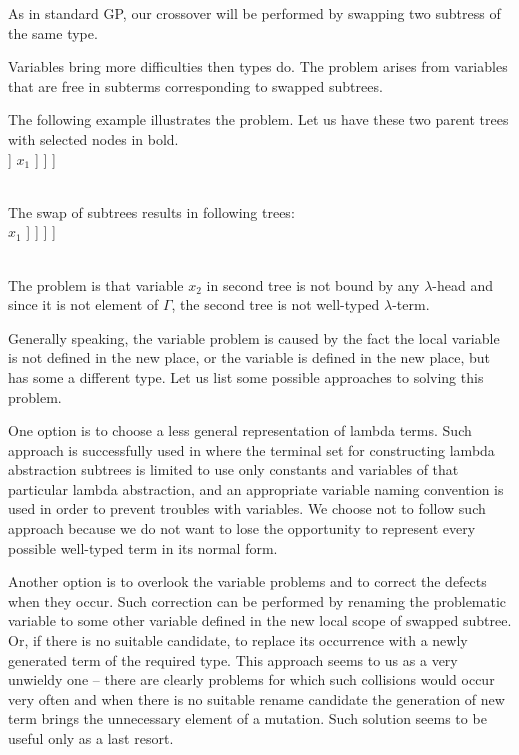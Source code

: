 \documentclass{sig-alternate}
\newcommand{\Lets}{Let us\xspace}
\newcommand{\lterm}{$\lambda$-term\xspace}
\newcommand{\lh}[1]{\lambda #1}
\begin{document}
As in standard GP, our crossover will be performed by swapping
two subtress of the same type.

Variables bring more difficulties then types do.
The problem arises from variables that are free in subterms corresponding to swapped subtrees. 

The following example illustrates the problem. \Lets have these two
parent trees with selected nodes in bold.\\

\Tree [.$\lh{x_1}$ [.f [.$\lh{x_2}$ [.\textbf{g} $x_2$ c ] ] $x_1$ ] ]
\Tree [.$\lh{x_1}$ [.h $x_1$ $\mathbf{x_1}$ ] ]

~\\The swap of subtrees results in following trees:\\

\Tree [.$\lh{x_1}$ [.f [.$\lh{x_2}$ $\mathbf{x_1}$ ] $x_1$ ] ]
\Tree [.$\lh{x_1}$ [.h $x_1$ [.\textbf{g} $\mathbf{x_2}$ \textbf{c} ] ] ]
 
~\\The problem is that variable $x_2$ in second tree
is not bound by any $\lambda$-head and since
it is not element of $\Gamma$, the second tree is not well-typed \lterm.  

Generally speaking, the variable problem is caused by the fact the local variable is not defined in the new place, or the variable is defined in the new place, but has
some a different type. Let us list some possible approaches to solving this problem.

One option is to choose a less general representation of lambda terms.
Such approach is successfully used in \cite{yu01} where the 
terminal set for constructing lambda abstraction subtrees 
is limited to use only constants and variables of that particular
lambda abstraction, and an appropriate variable naming convention is used in order to prevent troubles with variables.
We choose not to follow such approach because we do not want to
lose the opportunity to represent every possible well-typed 
term in its normal form.

Another option is to overlook the variable problems and to correct the
defects when they occur. Such correction can be performed by 
renaming the problematic variable to some other variable defined in the new local scope of swapped subtree. Or, if there is no suitable candidate, to replace its occurrence with a newly generated term of the required type. This approach seems to us as a very unwieldy one -- there are clearly problems for which such collisions would
occur very often and when there is no suitable rename candidate the 
generation of new term brings the unnecessary element of a mutation.
Such solution seems to be useful only as a last resort.
\end{document}
